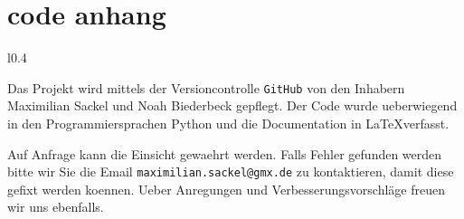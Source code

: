 \newpage
\section{code anhang}
\label{sec:06_code_anhang}
\begin{wrapfigure}{l}{0.4\textwidth}
\end{wrapfigure}
Das Projekt wird mittels der Versioncontrolle \texttt{GitHub} von den Inhabern
Maximilian Sackel
und Noah Biederbeck gepflegt. 
Der Code wurde ueberwiegend in den Programmiersprachen Python und die
Documentation in \LaTeX verfasst.

Auf Anfrage kann die Einsicht gewaehrt werden.
Falls Fehler gefunden werden bitte wir Sie die Email
\texttt{maximilian.sackel@gmx.de} zu kontaktieren, damit diese gefixt werden
koennen.
Ueber Anregungen und Verbesserungsvorschläge freuen wir uns ebenfalls.
